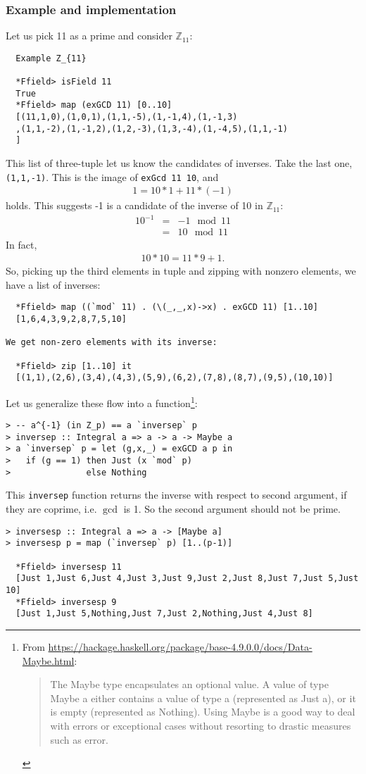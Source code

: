 \documentclass[11pt]{book}
\begin{document}
\subsubsection{Example and implementation}
\label{inverses}
Let us pick 11 as a prime and consider $\mathbb{Z}_{11}$:
\begin{verbatim}
  Example Z_{11}

  *Ffield> isField 11
  True
  *Ffield> map (exGCD 11) [0..10]
  [(11,1,0),(1,0,1),(1,1,-5),(1,-1,4),(1,-1,3)
  ,(1,1,-2),(1,-1,2),(1,2,-3),(1,3,-4),(1,-4,5),(1,1,-1)
  ]
\end{verbatim}
This list of three-tuple let us know the candidates of inverses.
Take the last one, \verb+(1,1,-1)+.
This is the image of \verb+exGcd 11 10+, and 
\begin{eqnarray}
1 = 10*1 + 11*(-1)
\end{eqnarray}
holds.
This suggests -1 is a candidate of the inverse of 10 in $\mathbb{Z}_{11}$:
\begin{eqnarray}
10^{-1} &=& -1 \mod 11 \\
&=& 10 \mod 11
\end{eqnarray}
In fact,
\begin{eqnarray}
10*10 = 11*9+1.
\end{eqnarray}
So, picking up the third elements in tuple and zipping with nonzero elements, we have a list of inverses:
\begin{verbatim}
  *Ffield> map ((`mod` 11) . (\(_,_,x)->x) . exGCD 11) [1..10] 
  [1,6,4,3,9,2,8,7,5,10]

We get non-zero elements with its inverse:

  *Ffield> zip [1..10] it
  [(1,1),(2,6),(3,4),(4,3),(5,9),(6,2),(7,8),(8,7),(9,5),(10,10)]
\end{verbatim}
Let us generalize these flow into a function\footnote{
From \url{https://hackage.haskell.org/package/base-4.9.0.0/docs/Data-Maybe.html}:
\begin{quotation}
The Maybe type encapsulates an optional value. 
A value of type Maybe a either contains a value of type a (represented as Just a), or it is empty (represented as Nothing). 
Using Maybe is a good way to deal with errors or exceptional cases without resorting to drastic measures such as error.
\end{quotation}
}:
\begin{verbatim}  
> -- a^{-1} (in Z_p) == a `inversep` p
> inversep :: Integral a => a -> a -> Maybe a
> a `inversep` p = let (g,x,_) = exGCD a p in
>   if (g == 1) then Just (x `mod` p)
>               else Nothing
\end{verbatim}
This \texttt{inversep} function returns the inverse with respect to second argument, if they are coprime, i.e. $\gcd$ is 1.
So the second argument should not be prime.
\begin{verbatim}
> inversesp :: Integral a => a -> [Maybe a]
> inversesp p = map (`inversep` p) [1..(p-1)]

  *Ffield> inversesp 11
  [Just 1,Just 6,Just 4,Just 3,Just 9,Just 2,Just 8,Just 7,Just 5,Just 10]
  *Ffield> inversesp 9
  [Just 1,Just 5,Nothing,Just 7,Just 2,Nothing,Just 4,Just 8]
\end{verbatim}
\end{document}
